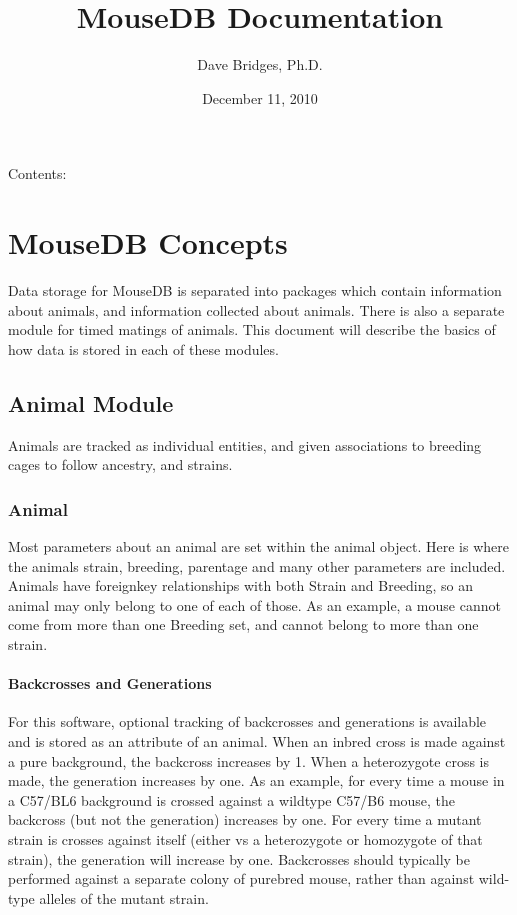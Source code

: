 \documentclass[letterpaper,10pt,english]{sphinxmanual}
\title{MouseDB Documentation}
\date{December 11, 2010}
\author{Dave Bridges, Ph.D.}
\begin{document}
\maketitle
\tableofcontents
{}\label{index::doc}


Contents:


\chapter{MouseDB Concepts}
\label{concepts:welcome-to-mousedb-s-documentation}\label{concepts::doc}\label{concepts:mousedb-concepts}
Data storage for MouseDB is separated into packages which contain information about animals, and information collected about animals.  There is also a separate module for timed matings of animals.  This document will describe the basics of how data is stored in each of these modules.


\section{Animal Module}
\label{concepts:animal-module}
Animals are tracked as individual entities, and given associations to breeding cages to follow ancestry, and strains.


\subsection{Animal}
\label{concepts:animal}
Most parameters about an animal are set within the animal object.  Here is where the animals strain, breeding, parentage and many other parameters are included.  Animals have foreignkey relationships with both Strain and Breeding, so an animal may only belong to one of each of those.  As an example, a mouse cannot come from more than one Breeding set, and cannot belong to more than one strain.


\subsubsection{Backcrosses and Generations}
\label{concepts:backcrosses-and-generations}
For this software, optional tracking of backcrosses and generations is available and is stored as an attribute of an animal.  When an inbred cross is made against a pure background, the backcross increases by 1.  When a heterozygote cross is made, the generation increases by one.  As an example, for every time a mouse in a C57/BL6 background is crossed against a wildtype C57/B6 mouse, the backcross (but not the generation) increases by one.  For every time a mutant strain is crosses against itself (either vs a heterozygote or homozygote of that strain), the generation will increase by one.  Backcrosses should typically be performed against a separate colony of purebred mouse, rather than against wild-type alleles of the mutant strain.
\end{document}

